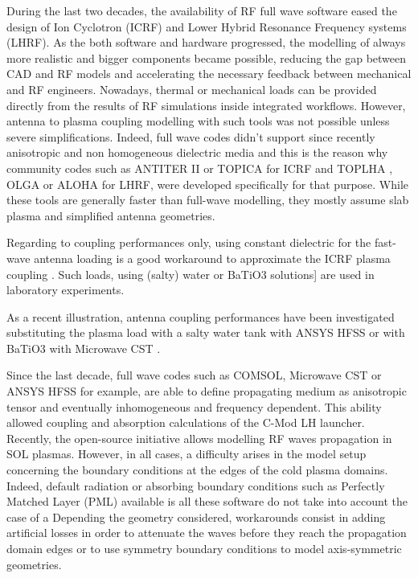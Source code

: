 \documentclass[preprint,3p,twocolumn]{elsarticle}
\begin{document}
During the last two decades, the availability of RF full wave software eased the design of Ion Cyclotron ({ICRF}) and Lower Hybrid Resonance Frequency systems ({LHRF}). As the both software and hardware progressed, the modelling of always more realistic and bigger components became possible, reducing the gap between CAD and RF models and accelerating the necessary feedback between mechanical and RF engineers. Nowadays, thermal or mechanical loads can be provided directly from the results of RF simulations inside integrated workflows. However, antenna to plasma coupling modelling with such tools was not possible unless severe simplifications. Indeed, full wave codes didn't support since recently anisotropic and non homogeneous dielectric media and this is the reason why community codes such as {ANTITER II} \cite{Messiaen2011} or {TOPICA} \cite{Lancellotti2006} for {ICRF} and {TOPLHA} \cite{Milanesio2012}, {OLGA} \cite{Preinhaelter2017} or {ALOHA} \cite{Hillairet2010a} for LHRF, were developed specifically for that purpose. While these tools are generally faster than full-wave modelling, they mostly assume slab plasma and simplified antenna geometries. %

Regarding to coupling performances only, using constant dielectric for the fast-wave antenna loading is a good workaround to approximate the ICRF plasma coupling \cite{Messiaen2011a}. Such loads, using (salty) water\cite{Messiaen2005} or BaTiO3 solutions\cite{Helou2018}] are used in laboratory experiments. 

As a recent illustration, antenna coupling performances have been investigated substituting the plasma load  with a salty water tank with ANSYS HFSS \cite{Ravera2012, Qin2015} or with BaTiO3 with Microwave CST \cite{Bottollier-Curtet2011}. 



Since the last decade, full wave codes such as {COMSOL}, Microwave {CST} or {ANSYS} {HFSS} for example, are able to define propagating medium as anisotropic tensor and eventually inhomogeneous and frequency dependent. 
This ability allowed coupling\cite{Meneghini2009g, Shiraiwa2009} and absorption\cite{Meneghini2009} calculations of the C-Mod LH launcher. Recently, the open-source initiative \cite{Shiraiwa2017} allows modelling RF waves propagation in SOL plasmas. However, in all cases, a difficulty arises in the model setup concerning the boundary conditions at the edges of the cold plasma domains. Indeed, default radiation or absorbing boundary conditions such as Perfectly Matched Layer (PML) available is all these software do not take into account the case of a \cite{Jacquot2013b}
Depending the geometry considered, workarounds consist in adding artificial losses in order to attenuate the waves before they reach the propagation domain edges\cite{bibid} or to use symmetry boundary conditions to model axis-symmetric geometries.   
\end{document}
